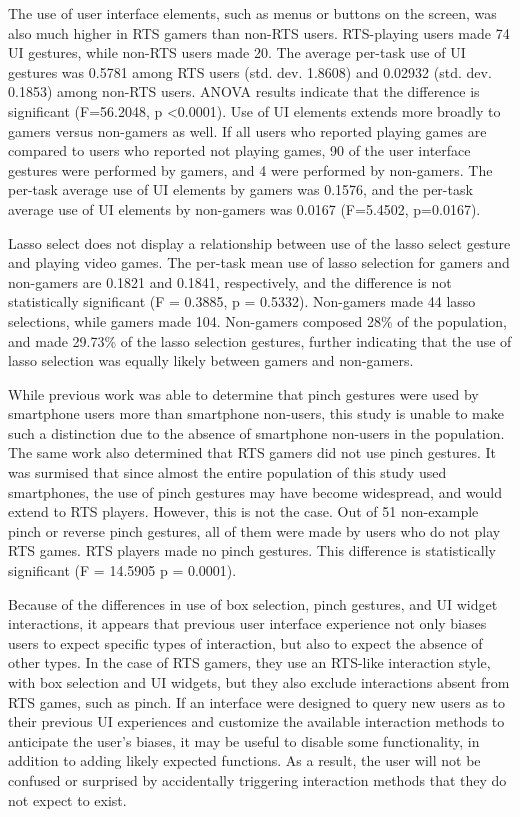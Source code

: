 The use of user interface elements, such as menus or buttons on the screen, was also much higher in RTS gamers than non-RTS users. 
RTS-playing users made 74 UI gestures, while non-RTS users made 20. 
The average per-task use of UI gestures was 0.5781 among RTS users (std. dev. 1.8608) and 0.02932 (std. dev. 0.1853) among non-RTS users. 
ANOVA results indicate that the difference is significant (F=56.2048, p \textless 0.0001).
Use of UI elements extends more broadly to gamers versus non-gamers as well. 
If all users who reported playing games are compared to users who reported not playing games, 90 of the user interface gestures were performed by gamers, and 4 were performed by non-gamers. 
The per-task average use of UI elements by gamers was 0.1576, and the per-task average use of UI elements by non-gamers was 0.0167 (F=5.4502, p=0.0167).

Lasso select does not display a relationship between use of the lasso select gesture and playing video games. 
The per-task mean use of lasso selection for gamers and non-gamers are 0.1821 and 0.1841, respectively, and the difference is not statistically significant (F = 0.3885, p = 0.5332).
Non-gamers made 44 lasso selections, while gamers made 104.
Non-gamers composed 28\% of the population, and made 29.73\% of the lasso selection gestures, further indicating that the use of lasso selection was equally likely between gamers and non-gamers. 

While previous work was able to determine that pinch gestures were used by smartphone users more than smartphone non-users, this study is unable to make such a distinction due to the absence of smartphone non-users in the population.  
The same work also determined that RTS gamers did not use pinch gestures.
It was surmised that since almost the entire population of this study used smartphones, the use of pinch gestures may have become widespread, and would extend to RTS players. 
However, this is not the case. 
Out of 51 non-example pinch or reverse pinch gestures, all of them were made by users who do not play RTS games.
RTS players made no pinch gestures.
This difference is statistically significant (F = 14.5905 p = 0.0001).

Because of the differences in use of box selection, pinch gestures, and UI widget interactions, it appears that previous user interface experience not only biases users to expect specific types of interaction, but also to expect the absence of other types. 
In the case of RTS gamers, they use an RTS-like interaction style, with box selection and UI widgets, but they also exclude interactions absent from RTS games, such as pinch. 
If an interface were designed to query new users as to their previous UI experiences and customize the available interaction methods to anticipate the user's biases, it may be useful to disable some functionality, in addition to adding likely expected functions. 
As a result, the user will not be confused or surprised by accidentally triggering interaction methods that they do not expect to exist.

